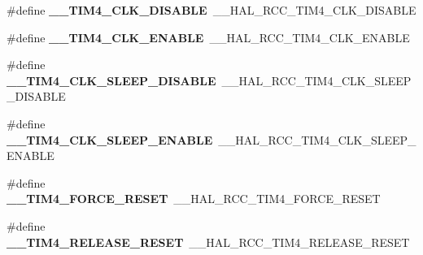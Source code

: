 \begin{DoxyCompactItemize}
\item 
\#define {\bfseries \+\_\+\+\_\+\+T\+I\+M4\+\_\+\+C\+L\+K\+\_\+\+D\+I\+S\+A\+B\+LE}~\+\_\+\+\_\+\+H\+A\+L\+\_\+\+R\+C\+C\+\_\+\+T\+I\+M4\+\_\+\+C\+L\+K\+\_\+\+D\+I\+S\+A\+B\+LE\hypertarget{group___h_a_l___r_c_c___aliased_ga489be82d36ad4def594b8ae60320f3c6}{}\label{group___h_a_l___r_c_c___aliased_ga489be82d36ad4def594b8ae60320f3c6}

\item 
\#define {\bfseries \+\_\+\+\_\+\+T\+I\+M4\+\_\+\+C\+L\+K\+\_\+\+E\+N\+A\+B\+LE}~\+\_\+\+\_\+\+H\+A\+L\+\_\+\+R\+C\+C\+\_\+\+T\+I\+M4\+\_\+\+C\+L\+K\+\_\+\+E\+N\+A\+B\+LE\hypertarget{group___h_a_l___r_c_c___aliased_gaa07342539b69e7fc53a934d91f6915e2}{}\label{group___h_a_l___r_c_c___aliased_gaa07342539b69e7fc53a934d91f6915e2}

\item 
\#define {\bfseries \+\_\+\+\_\+\+T\+I\+M4\+\_\+\+C\+L\+K\+\_\+\+S\+L\+E\+E\+P\+\_\+\+D\+I\+S\+A\+B\+LE}~\+\_\+\+\_\+\+H\+A\+L\+\_\+\+R\+C\+C\+\_\+\+T\+I\+M4\+\_\+\+C\+L\+K\+\_\+\+S\+L\+E\+E\+P\+\_\+\+D\+I\+S\+A\+B\+LE\hypertarget{group___h_a_l___r_c_c___aliased_gac785e48843cc0930737a7865794d502e}{}\label{group___h_a_l___r_c_c___aliased_gac785e48843cc0930737a7865794d502e}

\item 
\#define {\bfseries \+\_\+\+\_\+\+T\+I\+M4\+\_\+\+C\+L\+K\+\_\+\+S\+L\+E\+E\+P\+\_\+\+E\+N\+A\+B\+LE}~\+\_\+\+\_\+\+H\+A\+L\+\_\+\+R\+C\+C\+\_\+\+T\+I\+M4\+\_\+\+C\+L\+K\+\_\+\+S\+L\+E\+E\+P\+\_\+\+E\+N\+A\+B\+LE\hypertarget{group___h_a_l___r_c_c___aliased_ga4800dcd32761c733ad412cb7480f7f5a}{}\label{group___h_a_l___r_c_c___aliased_ga4800dcd32761c733ad412cb7480f7f5a}

\item 
\#define {\bfseries \+\_\+\+\_\+\+T\+I\+M4\+\_\+\+F\+O\+R\+C\+E\+\_\+\+R\+E\+S\+ET}~\+\_\+\+\_\+\+H\+A\+L\+\_\+\+R\+C\+C\+\_\+\+T\+I\+M4\+\_\+\+F\+O\+R\+C\+E\+\_\+\+R\+E\+S\+ET\hypertarget{group___h_a_l___r_c_c___aliased_gab4e910ec77744c42b35ba6fe5e5b902b}{}\label{group___h_a_l___r_c_c___aliased_gab4e910ec77744c42b35ba6fe5e5b902b}

\item 
\#define {\bfseries \+\_\+\+\_\+\+T\+I\+M4\+\_\+\+R\+E\+L\+E\+A\+S\+E\+\_\+\+R\+E\+S\+ET}~\+\_\+\+\_\+\+H\+A\+L\+\_\+\+R\+C\+C\+\_\+\+T\+I\+M4\+\_\+\+R\+E\+L\+E\+A\+S\+E\+\_\+\+R\+E\+S\+ET\hypertarget{group___h_a_l___r_c_c___aliased_gae07e507d12b6112b856c71866d6a62f1}{}\label{group___h_a_l___r_c_c___aliased_gae07e507d12b6112b856c71866d6a62f1}


\end{DoxyCompactItemize}
